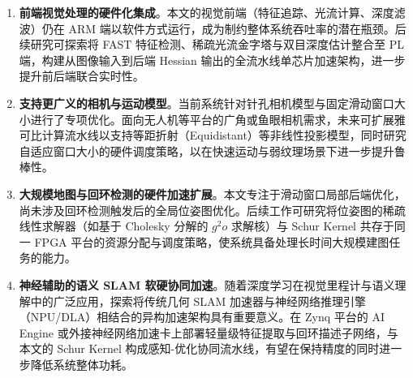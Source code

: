 \begin{enumerate}
    \item \textbf{前端视觉处理的硬件化集成}。本文的视觉前端（特征追踪、光流计算、深度滤波）仍在 ARM 端以软件方式运行，成为制约整体系统吞吐率的潜在瓶颈。后续研究可探索将 FAST 特征检测、稀疏光流金字塔与双目深度估计整合至 PL 端，构建从图像输入到后端 Hessian 输出的全流水线单芯片加速架构，进一步提升前后端联合实时性。

    \item \textbf{支持更广义的相机与运动模型}。当前系统针对针孔相机模型与固定滑动窗口大小进行了专项优化。面向无人机等平台的广角或鱼眼相机需求，未来可扩展雅可比计算流水线以支持等距折射（Equidistant）等非线性投影模型，同时研究自适应窗口大小的硬件调度策略，以在快速运动与弱纹理场景下进一步提升鲁棒性。

    \item \textbf{大规模地图与回环检测的硬件加速扩展}。本文专注于滑动窗口局部后端优化，尚未涉及回环检测触发后的全局位姿图优化。后续工作可研究将位姿图的稀疏线性求解器（如基于 Cholesky 分解的 $g^2o$ 求解核）与 Schur Kernel 共存于同一 FPGA 平台的资源分配与调度策略，使系统具备处理长时间大规模建图任务的能力。

    \item \textbf{神经辅助的语义 SLAM 软硬协同加速}。随着深度学习在视觉里程计与语义理解中的广泛应用，探索将传统几何 SLAM 加速器与神经网络推理引擎（NPU/DLA）相结合的异构加速架构具有重要意义。在 Zynq 平台的 AI Engine 或外接神经网络加速卡上部署轻量级特征提取与回环描述子网络，与本文的 Schur Kernel 构成感知-优化协同流水线，有望在保持精度的同时进一步降低系统整体功耗。
\end{enumerate}
